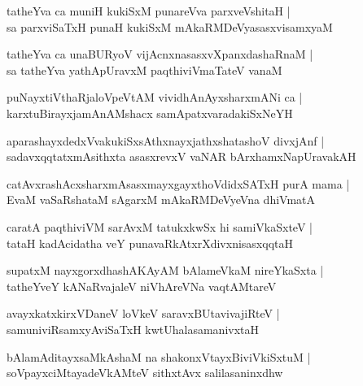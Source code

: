 \begin{shloka}
tatheYva ca muniH kukiSxM punareVva parxveVshitaH |\\
sa parxviSaTxH punaH kukiSxM mAkaRMDeVyasasxvisamxyaM 
\end{shloka}

\begin{shloka}
tatheYva ca unaBURyoV vijAcnxnasasxvXpanxdashaRnaM |\\
sa tatheYva yathApUravxM paqthiviVmaTateV vanaM 
\end{shloka}

\begin{shloka}
puNayxtiVthaRjaloVpeVtAM vividhAnAyxsharxmANi ca |\\
karxtuBirayxjamAnAMshacx samApatxvaradakiSxNeYH 
\end{shloka}

\begin{shloka}
aparashayxdedxVvakukiSxsAthxnayxjathx\R shatashoV divxjAnf |\\
sadavxqqtatxmAsithxta asasxrevxV vaNAR bArxhamxNapUravakAH 
\end{shloka}

\begin{shloka}
catAvxrashAcxsharxmAsasxmayxgayxthoVdidxSATxH purA mama |\\
EvaM vaSaRshataM sAgarxM mAkaRMDeVyeVna dhiVmatA 
\end{shloka}

\begin{shloka}
caratA paqthiviVM sarAvxM tatukxkwSx hi samiVkaSxteV |\\
tataH kadAcidatha veY punavaRkAtxrXdivxnisasxqqtaH 
\end{shloka}

\begin{shloka}
supatxM nayxgorxdhashAKAyAM bAlameVkaM nireYkaSxta |\\
tatheYveY kANaRvajaleV niVhAreVNa vaqtAMtareV
\end{shloka}

\begin{shloka}
avayxkatxkirxVDaneV loVkeV saravxBUtavivajiRteV |\\
samuniviRsamxyAviSaTxH kwtUhalasamanivxtaH 
\end{shloka}

\begin{shloka}
bAlamAditayxsaMkAshaM na shakonxVtayxBiviVkiSxtuM |\\
soVpayxciMtayadeVkAMteV sithxtAvx salilasaninxdhw
\end{shloka}

